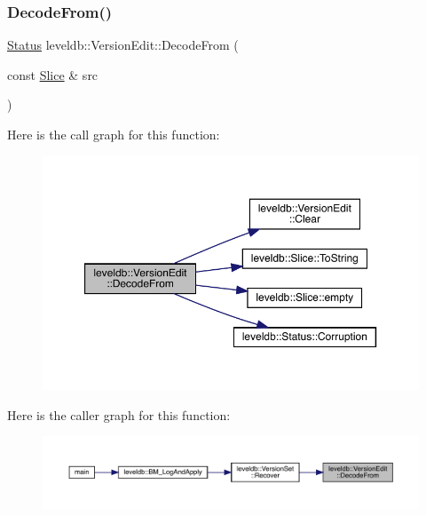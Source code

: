 \subsubsection{\texorpdfstring{DecodeFrom()}{DecodeFrom()}}
{\footnotesize\ttfamily \mbox{\hyperlink{classleveldb_1_1_status}{Status}} leveldb\+::\+Version\+Edit\+::\+Decode\+From (\begin{DoxyParamCaption}\item[{const \mbox{\hyperlink{classleveldb_1_1_slice}{Slice}} \&}]{src }\end{DoxyParamCaption})}

Here is the call graph for this function\+:
\nopagebreak
\begin{figure}[H]
\begin{center}
\leavevmode
\includegraphics[width=350pt]{classleveldb_1_1_version_edit_ac0f431c5e8f08c74c697d8480f7c005f_cgraph}
\end{center}
\end{figure}
Here is the caller graph for this function\+:
\nopagebreak
\begin{figure}[H]
\begin{center}
\leavevmode
\includegraphics[width=350pt]{classleveldb_1_1_version_edit_ac0f431c5e8f08c74c697d8480f7c005f_icgraph}
\end{center}
\end{figure}
\mbox{\label{classleveldb_1_1_version_edit_ac222bfd1055114d57aadbd124f24ad0c}} 
